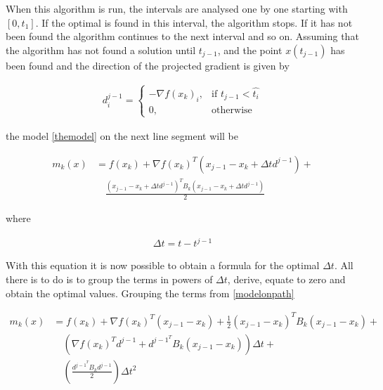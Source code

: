 When this algorithm is run, the intervals are analysed one by one starting with $[0, t_1]$.  If the optimal is found in this interval, the algorithm stops.  If it has not been found the algorithm continues to the next interval and so on.  Assuming that the algorithm has not found a solution until $t_{j-1}$, and the point $x(t_{j-1})$ has been found and the direction of the projected gradient is given by

\begin{equation}
  \begin{aligned}
    d_i^{j-1} = 
    \begin{cases}
      -\nabla f(x_k)_i, & \text{if } t_{j-1} < \hat{t_i} \\
      0, & \text{otherwise}
    \end{cases}
  \end{aligned}
\end{equation}

the model \ref{themodel} on the next line segment will be

\begin{equation} \label{modelonpath}
  \begin{aligned}
    m_k(x) & = f(x_k) + \nabla f(x_k)^T ( x_{j-1} - x_k + \Delta t d^{j-1}) + \\
     & \quad \frac{( x_{j-1} - x_k + \Delta t d^{j-1})^T B_k ( x_{j-1} - x_k + \Delta t d^{j-1})}{2}
  \end{aligned}
\end{equation}

where

\begin{equation*}
  \begin{aligned}
    \Delta t = t - t^{j-1}
  \end{aligned}
\end{equation*}

With this equation it is now possible to obtain a formula for the optimal $\Delta t$.  All there is to do is to group the terms in powers of $\Delta t$, derive, equate to zero and obtain the optimal values. Grouping the terms from \ref{modelonpath}

\begin{equation} \label{cauchyterms}
  \begin{aligned}
    m_k(x) & = f(x_k) + \nabla f(x_k)^T ( x_{j-1} - x_k) + 
    \frac{1}{2} ( x_{j-1} - x_k)^T B_k ( x_{j-1} - x_k) + \\
    & \quad \left( \nabla f(x_k)^T d^{j-1} + d^{{j-1}^T} B_k (x_{j-1} - x_k) 
    \right) \Delta t + \\
    & \quad \left( \frac{d^{{j-1}^T} B_k d^{j-1}}{2} \right) \Delta t^2
  \end{aligned}
\end{equation}

